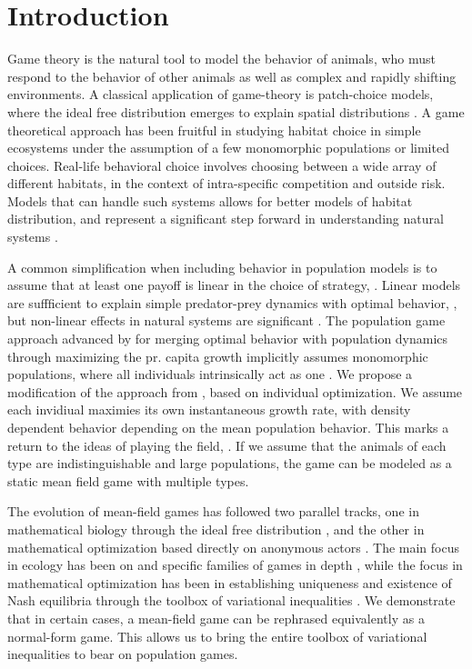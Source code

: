 \section{Introduction}

Game theory is the natural tool to model the behavior of animals, who must respond to the behavior of other animals as well as complex and rapidly shifting environments. A classical application of game-theory is patch-choice models, where the ideal free distribution emerges to explain spatial distributions  \citep{cressman2004ideal, fretwell1969territorial}. A game theoretical approach has been fruitful in studying habitat choice in simple ecosystems under the assumption of a few monomorphic populations or limited choices. Real-life behavioral choice involves choosing between a wide array of different habitats, in the context of intra-specific competition and outside risk. Models that can handle such systems allows for better models of habitat distribution, and represent a significant step forward in understanding natural systems \citep{morris2003shadows}.

A common simplification when including behavior in population models is to assume that at least one payoff is linear in the choice of strategy, \citep{krivan1997dynamic}. Linear models are suffficient to explain simple predator-prey dynamics with optimal behavior, \citep{kvrivan2007lotka}, but non-linear effects in natural systems are significant \citep{gross2009generalized}. The population game approach advanced by \citep{vincent2005evolutionary} for merging optimal behavior with population dynamics through maximizing the pr. capita growth implicitly assumes monomorphic populations, where all individuals intrinsically act as one \citep{malone2020ecology,stump2017optimally}. We propose a modification of the approach from \citep{vincent2005evolutionary}, based on individual optimization. We assume each invidiual maximies its own instantaneous growth rate, with density dependent behavior depending on the mean population behavior. This marks a return to the ideas of playing the field, \citep{smith1982evolution, cressman2010ideal}. If we assume that the animals of each type are indistinguishable and large populations, the game can be modeled as a static mean field game with multiple types.


The evolution of mean-field games has followed two parallel tracks, one in mathematical biology through the ideal free distribution \citep{fretwell1969territorial, cressman2004ideal, kvrivan2008ideal, cressman2010ideal}, and the other in mathematical optimization based directly on anonymous actors \citep{lasry2007mean, aumann1964markets, blanchet2016optimal}. The main focus in ecology has been on and specific families of games in depth \cite{broom2013game}, while the focus in mathematical optimization has been in establishing uniqueness and existence of Nash equilibria through the toolbox of variational inequalities \citep{karamardian1969nonlinear, gabay1980uniqueness, nabetani2011parametrized}. We demonstrate that in certain cases, a mean-field game can be rephrased equivalently as a normal-form game. This allows us to bring the entire toolbox of variational inequalities to bear on population games.


